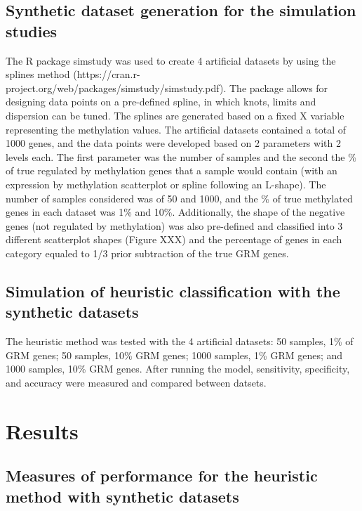 \documentclass[10pt,letterpaper]{article}
\begin{document}
\hypertarget{synthetic-dataset-generation-for-the-simulation-studies}{%
\subsection{Synthetic dataset generation for the simulation
studies}\label{synthetic-dataset-generation-for-the-simulation-studies}}

The R package simstudy was used to create 4 artificial datasets by using
the splines method
(https://cran.r-project.org/web/packages/simstudy/simstudy.pdf). The
package allows for designing data points on a pre-defined spline, in
which knots, limits and dispersion can be tuned. The splines are
generated based on a fixed X variable representing the methylation
values. The artificial datasets contained a total of 1000 genes, and the
data points were developed based on 2 parameters with 2 levels each. The
first parameter was the number of samples and the second the \% of true
regulated by methylation genes that a sample would contain (with an
expression by methylation scatterplot or spline following an L-shape).
The number of samples considered was of 50 and 1000, and the \% of true
methylated genes in each dataset was 1\% and 10\%. Additionally, the
shape of the negative genes (not regulated by methylation) was also
pre-defined and classified into 3 different scatterplot shapes (Figure
XXX) and the percentage of genes in each category equaled to 1/3 prior
subtraction of the true GRM genes.

\hypertarget{simulation-of-heuristic-classification-with-the-synthetic-datasets}{%
\subsection{Simulation of heuristic classification with the synthetic
datasets}\label{simulation-of-heuristic-classification-with-the-synthetic-datasets}}

The heuristic method was tested with the 4 artificial datasets: 50
samples, 1\% of GRM genes; 50 samples, 10\% GRM genes; 1000 samples, 1\%
GRM genes; and 1000 samples, 10\% GRM genes. After running the model,
sensitivity, specificity, and accuracy were measured and compared
between datsets.

\hypertarget{results}{%
\section{Results}\label{results}}

\hypertarget{measures-of-performance-for-the-heuristic-method-with-synthetic-datasets}{%
\subsection{Measures of performance for the heuristic method with
synthetic
datasets}\label{measures-of-performance-for-the-heuristic-method-with-synthetic-datasets}}
\end{document}
